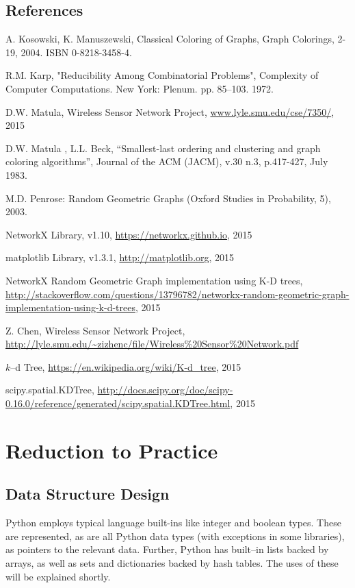 \documentclass[oneside, titlepage]{scrartcl}
\begin{document}
\subsection{References}
\begin{enumerate*}
\item
A. Kosowski, K. Manuszewski, Classical Coloring of Graphs, Graph Colorings, 2-19, 2004. ISBN 0-8218-3458-4.
\item
R.M. Karp, "Reducibility Among Combinatorial Problems", Complexity of Computer Computations. New York: Plenum. pp. 85--103. 1972.
\item
D.W. Matula, Wireless Sensor Network Project, \url{www.lyle.smu.edu/cse/7350/}, 2015
\item
D.W. Matula , L.L. Beck, ``Smallest-last ordering and clustering and graph coloring algorithms'', Journal of the ACM (JACM), v.30 n.3, p.417-427, July 1983.
\item
M.D. Penrose: Random Geometric Graphs (Oxford Studies in Probability, 5), 2003.
\item
NetworkX Library, v1.10, \url{https://networkx.github.io}, 2015
\item
matplotlib Library, v1.3.1, \url{http://matplotlib.org}, 2015
\item
NetworkX Random Geometric Graph implementation using K-D trees, \url{http://stackoverflow.com/questions/13796782/networkx-random-geometric-graph-implementation-using-k-d-trees}, 2015
\item
Z. Chen, Wireless Sensor Network Project, \url{http://lyle.smu.edu/~zizhenc/file/Wireless\%20Sensor\%20Network.pdf}
\item
$k$--d Tree, \url{https://en.wikipedia.org/wiki/K-d_tree}, 2015
\item
scipy.spatial.KDTree, \url{http://docs.scipy.org/doc/scipy-0.16.0/reference/generated/scipy.spatial.KDTree.html}, 2015
\end{enumerate*}

\section{Reduction to Practice}
\subsection{Data Structure Design}
Python employs typical language built-ins like integer and boolean types. These are represented, as are all Python data types (with exceptions in some libraries), as pointers to the relevant data. Further, Python has built--in lists backed by arrays, as well as sets and dictionaries backed by hash tables. The uses of these will be explained shortly.
\end{document}
